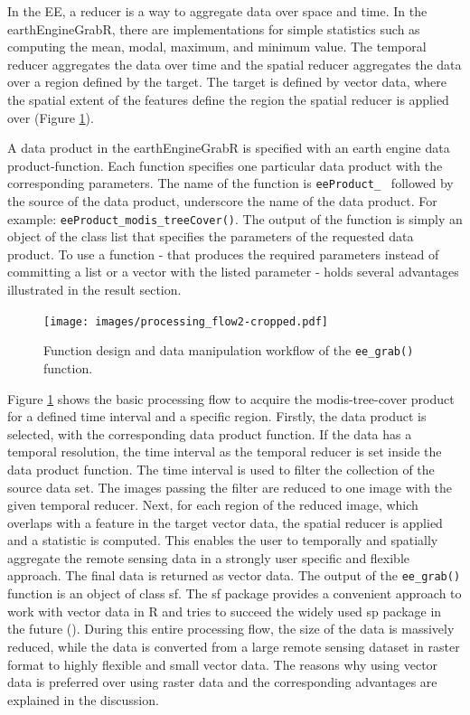In the EE, a reducer is a way to aggregate data over space and time. In the earthEngineGrabR, there are implementations for simple statistics such as computing the mean, modal, maximum, and minimum value. The temporal reducer aggregates the data over time and the spatial reducer aggregates the data over a region defined by the target. 
The target is defined by vector data, where the spatial extent of the features define the region the spatial reducer is applied over (Figure \ref*{Workflow}).

A data product in the earthEngineGrabR is specified with an earth engine data product-function. Each function specifies one particular data product with the corresponding parameters. The name of the function is \texttt{eeProduct\_ } followed by the source of the data product, underscore the name of the data product. For example: \texttt{eeProduct\_modis\_treeCover()}. The output of the function is simply an object of the class list that specifies the parameters of the requested data product. To use a function - that produces the required parameters instead of committing a list or a vector with the listed parameter - holds several advantages illustrated in the result section.




\begin{center}
	\begin{figure}[h]
		\begin{center}
			\texttt{[image: images/processing\_flow2-cropped.pdf]}
			\caption{Function design and data manipulation workflow of the \texttt{ee\_grab()} function.}
			\label{Workflow}
		\end{center}
	\end{figure}
\end{center}

Figure \ref{Workflow} shows the basic processing flow to acquire the modis-tree-cover product for a defined time interval and a specific region. Firstly, the data product is selected, with the corresponding data product function. If the data has a temporal resolution, the time interval as the temporal reducer is set inside the data product function. The time interval is used to filter the collection of the source data set. The images passing the filter are reduced to one image with the given temporal reducer. Next, for each region of the reduced image, which overlaps with a feature in the target vector data, the spatial reducer is applied and a statistic is computed. This enables the user to temporally and spatially aggregate the remote sensing data in a strongly user specific and flexible approach. The final data is returned as vector data.
The output of the \texttt{ee\_grab()} function is an object of class sf. The sf package provides a convenient approach to work with vector data in R and tries to succeed the widely used sp package in the future (\cite{sf}). 
During this entire processing flow, the size of the data is massively reduced, while the data is converted from a large remote sensing dataset in raster format to highly flexible and small vector data. The reasons why using vector data is preferred over using raster data and the corresponding advantages are explained in the discussion.

